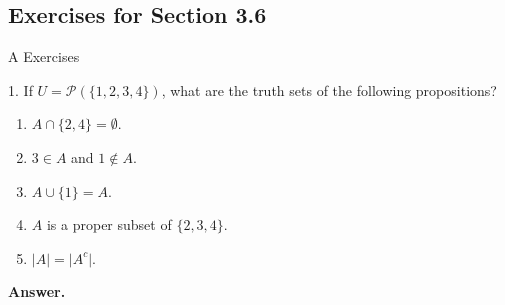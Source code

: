 \documentclass[10pt,]{book}
\theoremstyle{plain}
\theoremstyle{definition}
\theoremstyle{definition}
\theoremstyle{definition}
\theoremstyle{definition}
\begin{document}
\subsection[Exercises for Section 3.6 ]{Exercises for Section 3.6 }\label{exercises-3.6}
\hypertarget{exercisegroup-8}{}\typeout{************************************************}
\typeout{************************************************}
A Exercises%
\begin{exercisegroup}
\item[1.]\hypertarget{exercise-31}{} If \(U = \mathcal{P}( \{1, 2, 3, 4\})\), what are the truth sets of the following propositions?%
\par
\leavevmode%
\begin{enumerate}[label=\alph*]
\item\hypertarget{li-240}{} \(A \cap  \{2, 4\} = \emptyset\).%
\item\hypertarget{li-241}{} \(3 \in  A\) and \(1 \notin  A\).%
\item\hypertarget{li-242}{} \(A \cup  \{1\} = A\).%
\item\hypertarget{li-243}{}  \(A\) is a proper subset of \(\{2, 3, 4\}\).%
\item\hypertarget{li-244}{} \(\lvert A \rvert=\lvert A^c \rvert\).%
\end{enumerate}

%
\par\smallskip
\par\smallskip
\noindent\textbf{Answer.}\hypertarget{answer-15}{}\quad


\end{exercisegroup}
\end{document}
